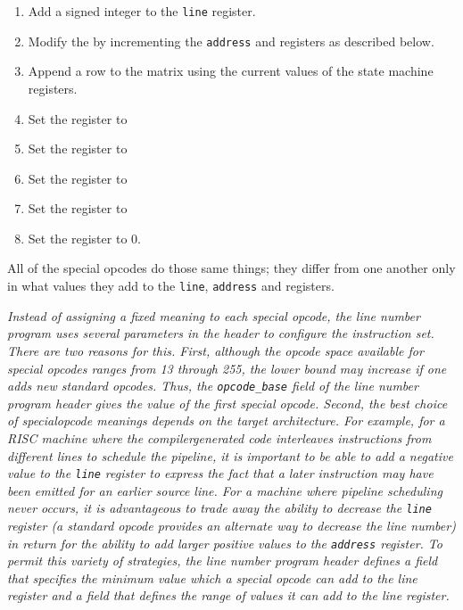 \begin{enumerate}[1. ]

\item  Add a signed integer to the \texttt{line} register.

\item  Modify the  by incrementing the
\texttt{address} and  registers as described below.

\item  Append a row to the matrix using the current values
of the state machine registers.

\item  Set the  register to 
\item  Set the  register to 
\item  Set the  register to 
\bb
\item  Set the  register to 
\eb
\item  Set the  register to 0.

\end{enumerate}

All of the special opcodes do those same 
\db
things; they differ from one another only in what values 
they add to the \texttt{line}, \texttt{address} and 
 registers.

\textit{Instead of assigning a fixed meaning to each special opcode,
the line number program uses several parameters in the header
to configure the instruction set. There are two reasons
for this.  First, although the opcode space available for
special opcodes ranges from 13 through 255, the lower
bound may increase if one adds new standard opcodes. Thus, the
\texttt{opcode\_base} field of the line number program header gives the
value of the first special opcode. Second, the best choice of
special\dash opcode meanings depends on the target architecture. For
example, for a RISC machine where the compiler\dash generated code
interleaves instructions from different lines to schedule
the pipeline, it is important to be able to add a negative
value to the \texttt{line} register to express the fact that a later
instruction may have been emitted for an earlier source
line. For a machine where pipeline scheduling never occurs,
it is advantageous to trade away the ability to decrease
the \texttt{line} register (a standard opcode provides an alternate
way to decrease the line number) in return for the ability
to add larger positive values to the \texttt{address} register. To
permit this variety of strategies, the line number program
header defines a 
field that specifies the minimum
value which a special opcode can add to the line register
and a 
field that defines the range of values it
can add to the line register.}


